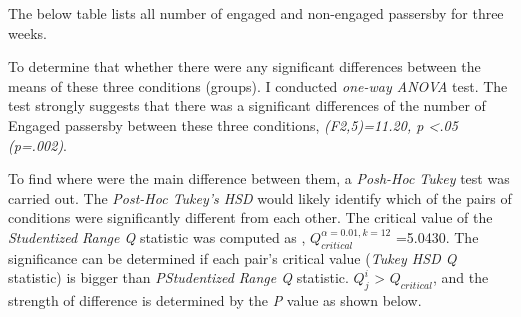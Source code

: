 The below table lists all number of engaged and non-engaged passersby for three weeks.


\begin{table}[H]
\caption{Number of engaged passersby in three weeks}
\label{tab:engagedofthreeweeks}
\centering
{}
\end{table}

To determine that whether there were any significant differences between the means of these three conditions (groups). I conducted \emph{one-way ANOVA} test. The test strongly suggests that there was a significant differences of the number of Engaged passersby between these three conditions,
 \emph{(F2,5)=11.20, p <.05 (p=.002)}.

To find where were the main difference between them, a \emph{Posh-Hoc Tukey} test was carried out. The \emph{Post-Hoc Tukey’s HSD} would likely identify which of the pairs of conditions were significantly different from each other. The critical value of the \emph{Studentized Range Q} statistic was computed as , ${Q}_{critical}^{\alpha=0.01,k=12}$ =5.0430. The significance can be determined if each pair’s critical value (\emph{Tukey HSD Q} statistic) is bigger than \emph{PStudentized Range Q} statistic. ${Q}_{j}^{i }$ > ${Q}_{critical}$, and the strength of difference is determined by the \emph{P} value as shown below.



\begin{table}[H]
\caption{Post-Hoc Tukey’s HSD}
\label{tab:engage-non-posthoctukey}
\centering
{}
\end{table}

